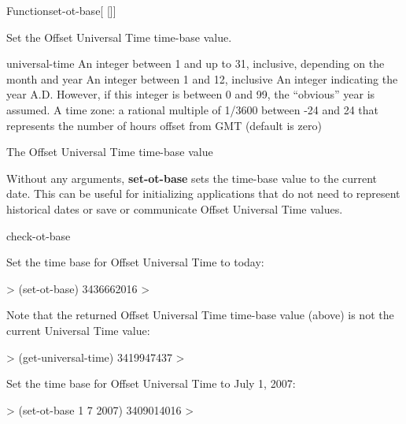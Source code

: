 \documentclass[10pt,twoside,english,pdftex]{article}
\begin{document}
\begin{functiondoc}{Function}{set-ot-base}{[
   []]
  \returns{} }
%

\fnsyntax

\fnpurpose Set the Offset Universal Time time-base value.

\fnpackage {}

\fnmodule {}

\fnargs
\begin{args}{universal-time}
  \arg[date] An integer between 1 and up to 31, inclusive, depending
  on the month and year
  \arg[month] An integer between 1 and 12, inclusive
  \arg[year] An integer indicating the year A.D. However, if this
  integer is between 0 and 99, the ``obvious'' year is assumed.
   A time zone: a rational multiple of 1/3600 between
  -24 and 24 that represents the number of hours offset from GMT 
  (default is zero)
\end{args}

\fnreturns The Offset Universal Time time-base value

\fndescription Without any arguments, \textbf{set-ot-base} sets the
time-base value to the current date.  This can be useful for
initializing applications that do not need to represent historical
dates or save or communicate Offset Universal Time values.

\begin{alsos}{check-ot-base}
\also[*ot-base*]
\also[ot2ut]
\also[ut2ot]
\end{alsos}

\fnexamples
Set the time base for Offset Universal Time to today:
%
\W\supp
\begin{example}
  > (set-ot-base)
  3436662016
  >
\end{example}
Note that the returned Offset Universal Time time-base value (above) is not
the current Universal Time value:
%
\W\supp\notpretop
\begin{example}
  > (get-universal-time)
  3419947437
  >
\end{example}

Set the time base for Offset Universal Time to July 1, 2007:
%
\W\supp
\begin{example}
  > (set-ot-base 1 7 2007)
  3409014016
  >
\end{example}

\end{functiondoc}
\end{document}
